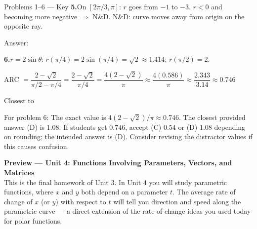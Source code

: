 \documentclass[10pt]{article}
\begin{document}
\begin{notesbox}{Problems 1--6 --- Key}
\vspace{0.14in}
\textbf{5.}\quad On $[2\pi/3, \pi]$: $r$ goes from $-1$ to $-3$.
$r < 0$ and becoming more negative $\Rightarrow$ N\&D.
N\&D: curve moves away from origin on the opposite ray.

Answer: 

\vspace{0.12in}
\textbf{6.}\quad $r = 2\sin\theta$: $r(\pi/4) = 2\sin(\pi/4) = \sqrt{2} \approx 1.414$;
$r(\pi/2) = 2$.

ARC $= \dfrac{2 - \sqrt{2}}{\pi/2 - \pi/4} = \dfrac{2 - \sqrt{2}}{\pi/4} = \dfrac{4(2-\sqrt{2})}{\pi} \approx \dfrac{4(0.586)}{\pi} \approx \dfrac{2.343}{3.14} \approx 0.746$

Closest to 

\begin{teachernote}
For problem 6: The exact value is $4(2-\sqrt{2})/\pi \approx 0.746$. The closest provided answer (D) is $1.08$. If students get $0.746$, accept (C) $0.54$ or (D) $1.08$ depending on rounding; the intended answer is (D). Consider revising the distractor values if this causes confusion.
\end{teachernote}

\end{notesbox}

\vspace{0.08in}

\begin{tcolorbox}[colback=navylight, colframe=navy, arc=2mm,
    left=3mm, right=3mm, top=2mm, bottom=2mm]
\small\textbf{Preview --- Unit 4: Functions Involving Parameters, Vectors, and Matrices}\\
This is the final homework of Unit 3. In Unit 4 you will study parametric functions,
where $x$ and $y$ both depend on a parameter $t$. The average rate of change of $x$
(or $y$) with respect to $t$ will tell you direction and speed along the parametric curve ---
a direct extension of the rate-of-change ideas you used today for polar functions.
\end{tcolorbox}
\end{document}
